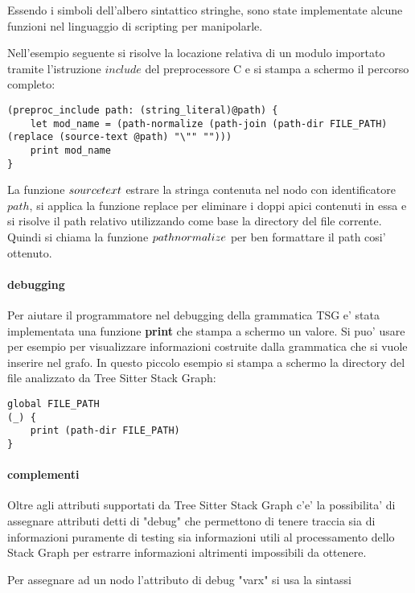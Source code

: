 Essendo i simboli dell'albero sintattico stringhe, sono state implementate alcune funzioni nel linguaggio di scripting per manipolarle.

Nell'esempio seguente si risolve la locazione relativa di un modulo importato tramite l'istruzione $include$ del preprocessore C e si stampa a schermo il percorso completo:

\begin{verbatim}
(preproc_include path: (string_literal)@path) {
    let mod_name = (path-normalize (path-join (path-dir FILE_PATH) (replace (source-text @path) "\"" "")))
    print mod_name
}
\end{verbatim}

La funzione $source\-text$ estrare la stringa contenuta nel nodo con identificatore $path$, si applica la funzione replace per eliminare i doppi apici contenuti in essa e si risolve il path relativo utilizzando come base la directory del file corrente.
Quindi si chiama la funzione $path\-normalize$ per ben formattare il path cosi' ottenuto.

\paragraph{debugging}

Per aiutare il programmatore nel debugging della grammatica TSG e' stata implementata una funzione \textbf{print} che stampa a schermo un valore.
Si puo' usare per esempio per visualizzare informazioni costruite dalla grammatica che si vuole inserire nel grafo.
In questo piccolo esempio si stampa a schermo la directory del file analizzato da Tree Sitter Stack Graph:

\begin{verbatim}
global FILE_PATH
(_) {
    print (path-dir FILE_PATH)
}
\end{verbatim}

\paragraph{complementi}

Oltre agli attributi supportati da Tree Sitter Stack Graph c'e' la possibilita' di assegnare attributi detti di "debug" che permettono di tenere traccia sia di informazioni puramente di testing sia informazioni utili al processamento dello Stack Graph per estrarre informazioni altrimenti impossibili da ottenere.

Per assegnare ad un nodo l'attributo di debug "varx" si usa la sintassi

